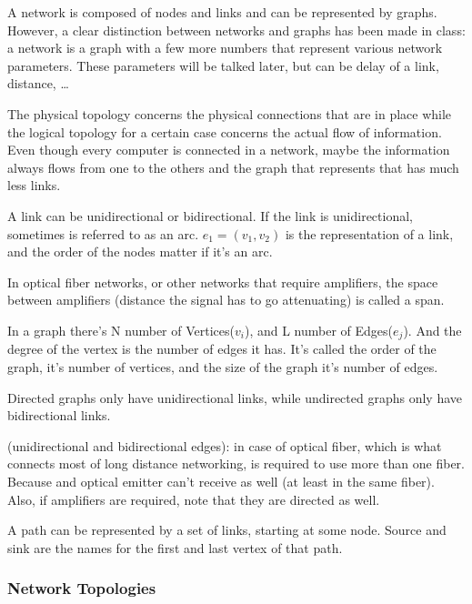 A network is composed of nodes and links and can be represented by graphs.
However, a clear distinction between networks and graphs has been made in class: a network is a graph with a few more numbers that represent various network parameters. These parameters will be talked later, but can be delay of a link, distance, \dots


The physical topology concerns the physical connections that are in place while the logical topology for a certain case concerns the actual flow of information. Even though every computer is connected in a network, maybe the information always flows from one to the others and the graph that represents that has much less links.


A link can be unidirectional or bidirectional. If the link is unidirectional, sometimes is referred to as an arc. $e_1 = (v_1,v_2)$ is the representation of a link, and the order of the nodes matter if it's an arc.

In optical fiber networks, or other networks that require amplifiers, the space between amplifiers (distance the signal has to go attenuating) is called a span.



In a graph there's N number of Vertices($v_i$), and L number of Edges($e_j$). And the degree of the vertex is the number of edges it has.
It's called the order of the graph, it's number of vertices, and the size of the graph it's number of edges.

Directed graphs only have unidirectional links, while undirected graphs only have bidirectional links.

(unidirectional and bidirectional edges): in case of optical fiber, which is what connects most of long distance networking, is required to use more than one fiber. Because and optical emitter can't receive as well (at least in the same fiber). 
Also, if amplifiers are required, note that they are directed as well.

A path can be represented by a set of links, starting at some node. Source and sink are the names for the first and last vertex of that path.

\subsubsection{Network Topologies}



